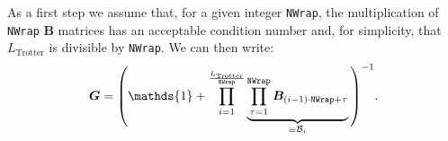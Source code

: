 As a first step we assume that, for a given integer \texttt{NWrap}, the multiplication of \texttt{NWrap} $\bm{B}$ matrices has an acceptable condition number and, for simplicity, that $L_{\text{Trotter}}$ is divisible by \texttt{NWrap}. We can then write:
\begin{equation}
\bm{G} = \Vast( \mathds{1} + \prod\limits_{ i = 1}^{\frac{L_{\text{Trotter}}} {\texttt{NWrap}}}       \underbrace{\prod_{\tau=1}^{\texttt{NWrap}} \bm{B}_{(i-1)  \cdot  \texttt{NWrap}+ \tau} }_{ \equiv \mathcal{\bm{B}}_i} \Vast)^{-1}.
\end{equation}

